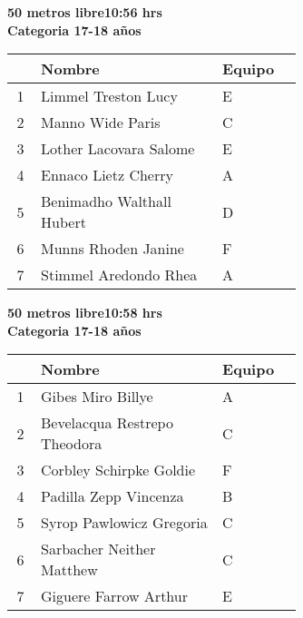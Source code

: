\begin{minipage}{0.95\linewidth}\vspace{0.5cm} 
\begin{flushleft}
\textbf{
\hspace{-0.15cm}50 metros libre\hspace{1.5cm}10:56 hrs \\Categoria 17-18 años}\vspace{-0.2cm} 
\end{flushleft}
\begin{tabular}{cp{0.63\linewidth}l}
\hline
& \textbf{Nombre} & \textbf{Equipo} \\ \hline
1 & Limmel Treston Lucy & E \\ 
2 & Manno Wide Paris & C \\ 
3 & Lother Lacovara Salome & E \\ 
4 & Ennaco Lietz Cherry & A \\ 
5 & Benimadho Walthall Hubert & D \\ 
6 & Munns Rhoden Janine & F \\ 
7 & Stimmel Aredondo Rhea & A \\ 
\end{tabular}
\end{minipage}
\begin{minipage}{0.95\linewidth}\vspace{0.5cm} 
\begin{flushleft}
\textbf{
\hspace{-0.15cm}50 metros libre\hspace{1.5cm}10:58 hrs \\Categoria 17-18 años}\vspace{-0.2cm} 
\end{flushleft}
\begin{tabular}{cp{0.63\linewidth}l}
\hline
& \textbf{Nombre} & \textbf{Equipo} \\ \hline
1 & Gibes Miro Billye & A \\ 
2 & Bevelacqua Restrepo Theodora & C \\ 
3 & Corbley Schirpke Goldie & F \\ 
4 & Padilla Zepp Vincenza & B \\ 
5 & Syrop Pawlowicz Gregoria & C \\ 
6 & Sarbacher Neither Matthew & C \\ 
7 & Giguere Farrow Arthur & E \\ 
\end{tabular}
\end{minipage}
